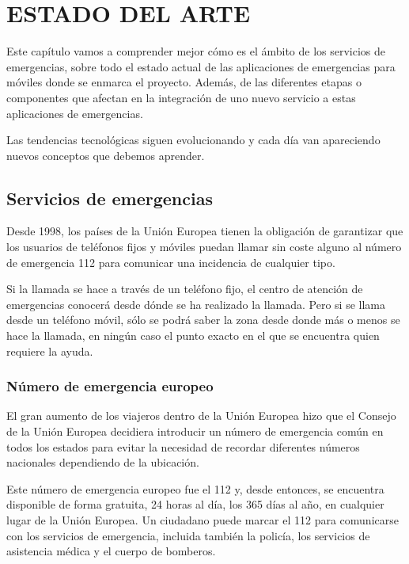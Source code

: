 \chapter{ESTADO DEL ARTE\label{sec:estado_del_arte}}

Este capítulo vamos a comprender mejor cómo es el ámbito de los servicios de emergencias, sobre todo el estado actual de las aplicaciones de emergencias para móviles donde se enmarca el proyecto. Además, de las diferentes etapas o componentes que afectan en la integración de uno nuevo servicio a estas aplicaciones de emergencias.

Las tendencias tecnológicas siguen evolucionando y cada día van apareciendo nuevos conceptos que debemos aprender.

\clearpage

\section{Servicios de emergencias}

Desde 1998, los países de la Unión Europea tienen la obligación de garantizar que los usuarios de teléfonos fijos y móviles puedan llamar sin coste alguno al número de emergencia 112 para comunicar una incidencia de cualquier tipo.

Si la llamada se hace a través de un teléfono fijo, el centro de atención de emergencias conocerá desde dónde se ha realizado la llamada. Pero si se llama desde un teléfono móvil, sólo se podrá saber la zona desde donde más o menos se hace la llamada, en ningún caso el punto exacto en el que se encuentra quien requiere la ayuda.

\subsection{Número de emergencia europeo}

El gran aumento de los viajeros dentro de la Unión Europea hizo que el Consejo de la Unión Europea decidiera introducir un número de emergencia común en todos los estados para evitar la necesidad de recordar diferentes números nacionales dependiendo de la ubicación.

Este número de emergencia europeo fue el 112 y, desde entonces, se encuentra disponible de forma gratuita, 24 horas al día, los 365 días al año, en cualquier lugar de la Unión Europea. Un ciudadano puede marcar el 112 para comunicarse con los servicios de emergencia, incluida también la policía, los servicios de asistencia médica y el cuerpo de bomberos.

